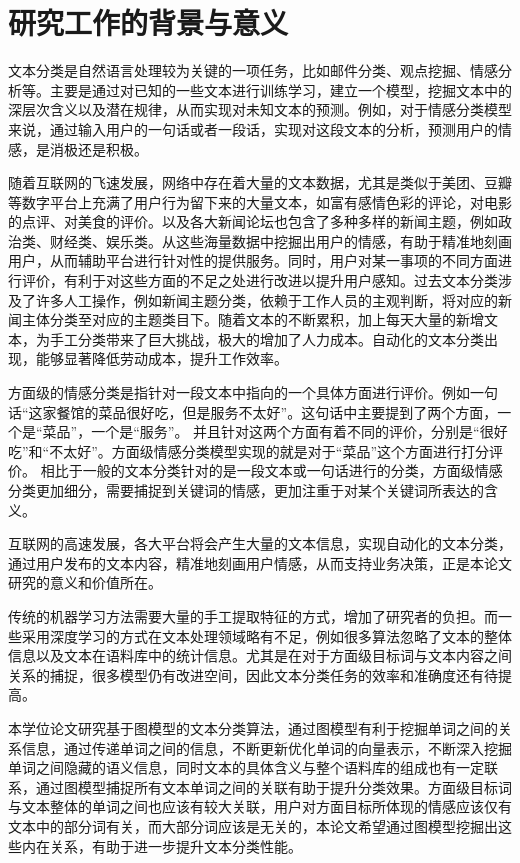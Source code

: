 \thesischapterexordium

\section{研究工作的背景与意义}
文本分类是自然语言处理较为关键的一项任务，比如邮件分类、观点挖掘、情感分析等。主要是通过对已知的一些文本进行训练学习，建立一个模型，挖掘文本中的深层次含义以及潜在规律，从而实现对未知文本的预测。例如，对于情感分类模型来说，通过输入用户的一句话或者一段话，实现对这段文本的分析，预测用户的情感，是消极还是积极。

随着互联网的飞速发展，网络中存在着大量的文本数据，尤其是类似于美团、豆瓣等数字平台上充满了用户行为留下来的大量文本，如富有感情色彩的评论，对电影的点评、对美食的评价。以及各大新闻论坛也包含了多种多样的新闻主题，例如政治类、财经类、娱乐类。从这些海量数据中挖掘出用户的情感，有助于精准地刻画用户，从而辅助平台进行针对性的提供服务。同时，用户对某一事项的不同方面进行评价，有利于对这些方面的不足之处进行改进以提升用户感知。过去文本分类涉及了许多人工操作，例如新闻主题分类，依赖于工作人员的主观判断，将对应的新闻主体分类至对应的主题类目下。随着文本的不断累积，加上每天大量的新增文本，为手工分类带来了巨大挑战，极大的增加了人力成本。自动化的文本分类出现，能够显著降低劳动成本，提升工作效率。

方面级的情感分类是指针对一段文本中指向的一个具体方面进行评价。例如一句话“这家餐馆的菜品很好吃，但是服务不太好”。这句话中主要提到了两个方面，一个是“菜品”，一个是“服务”。
并且针对这两个方面有着不同的评价，分别是“很好吃”和“不太好”。方面级情感分类模型实现的就是对于“菜品”这个方面进行打分评价。
相比于一般的文本分类针对的是一段文本或一句话进行的分类，方面级情感分类更加细分，需要捕捉到关键词的情感，更加注重于对某个关键词所表达的含义。

互联网的高速发展，各大平台将会产生大量的文本信息，实现自动化的文本分类，通过用户发布的文本内容，精准地刻画用户情感，从而支持业务决策，正是本论文研究的意义和价值所在。

传统的机器学习方法需要大量的手工提取特征的方式，增加了研究者的负担。而一些采用深度学习的方式在文本处理领域略有不足，例如很多算法忽略了文本的整体信息以及文本在语料库中的统计信息。尤其是在对于方面级目标词与文本内容之间关系的捕捉，很多模型仍有改进空间，因此文本分类任务的效率和准确度还有待提高。       

本学位论文研究基于图模型的文本分类算法，通过图模型有利于挖掘单词之间的关系信息，通过传递单词之间的信息，不断更新优化单词的向量表示，不断深入挖掘单词之间隐藏的语义信息，同时文本的具体含义与整个语料库的组成也有一定联系，通过图模型捕捉所有文本单词之间的关联有助于提升分类效果。方面级目标词与文本整体的单词之间也应该有较大关联，用户对方面目标所体现的情感应该仅有文本中的部分词有关，而大部分词应该是无关的，本论文希望通过图模型挖掘出这些内在关系，有助于进一步提升文本分类性能。

